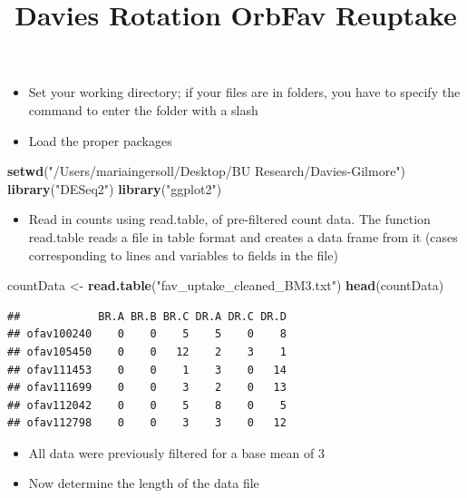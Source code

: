 \documentclass[
]{article}
\title{Davies Rotation OrbFav Reuptake}
\author{}
\date{\vspace{-2.5em}}
\newenvironment{Shaded}{\begin{snugshade}}{\end{snugshade}}
\newcommand{\KeywordTok}[1]{\textcolor[rgb]{0.13,0.29,0.53}{\textbf{#1}}}
\newcommand{\NormalTok}[1]{#1}
\newcommand{\StringTok}[1]{\textcolor[rgb]{0.31,0.60,0.02}{#1}}
\providecommand{\tightlist}{%
  \setlength{\itemsep}{0pt}\setlength{\parskip}{0pt}}
\begin{document}
\maketitle

\begin{itemize}
\tightlist
\item
  Set your working directory; if your files are in folders, you have to
  specify the command to enter the folder with a slash
\item
  Load the proper packages
\end{itemize}

\begin{Shaded}
\begin{Highlighting}[]
\KeywordTok{setwd}\NormalTok{(}\StringTok{"/Users/mariaingersoll/Desktop/BU Research/Davies-Gilmore"}\NormalTok{)}
\KeywordTok{library}\NormalTok{(}\StringTok{"DESeq2"}\NormalTok{)}
\KeywordTok{library}\NormalTok{(}\StringTok{"ggplot2"}\NormalTok{)}
\end{Highlighting}
\end{Shaded}

\begin{itemize}
\tightlist
\item
  Read in counts using read.table, of pre-filtered count data. The
  function read.table reads a file in table format and creates a data
  frame from it (cases corresponding to lines and variables to fields in
  the file)
\end{itemize}

\begin{Shaded}
\begin{Highlighting}[]
\NormalTok{countData <-}\StringTok{ }\KeywordTok{read.table}\NormalTok{(}\StringTok{"fav_uptake_cleaned_BM3.txt"}\NormalTok{)}
\KeywordTok{head}\NormalTok{(countData)}
\end{Highlighting}
\end{Shaded}

\begin{verbatim}
##            BR.A BR.B BR.C DR.A DR.C DR.D
## ofav100240    0    0    5    5    0    8
## ofav105450    0    0   12    2    3    1
## ofav111453    0    0    1    3    0   14
## ofav111699    0    0    3    2    0   13
## ofav112042    0    0    5    8    0    5
## ofav112798    0    0    3    3    0   12
\end{verbatim}

\begin{itemize}
\tightlist
\item
  All data were previously filtered for a base mean of 3
\item
  Now determine the length of the data file
\end{itemize}
\end{document}
